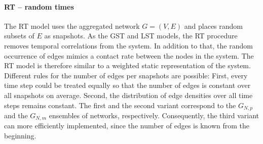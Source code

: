 \paragraph{RT -- random times\color{Cayenne}{.}}
The RT model uses the aggregated network $G=(V,E)$ and places random subsets of $E$ as snapshots.
As the GST and LST models, the RT procedure removes temporal correlations from the system.
In addition to that, the random occurrence of edges mimics a contact rate between the nodes in the system.
The RT model is therefore similar to a weighted static representation of the system.
Different rules for the number of edges per snapshots are possible:
First, every time step could be treated equally so that the number of edges is constant over all snapshots on average.
Second, the distribution of edge densities over all time steps remains constant.
The first and the second variant correspond to the $G_{N,p}$ and the $G_{N,m}$ ensembles of \ER networks, respectively.
Consequently, the third variant can more efficiently implemented, since the number of edges is known from the beginning.

